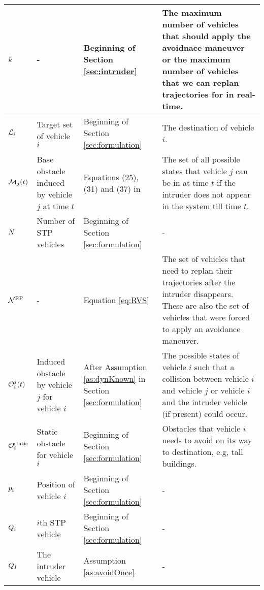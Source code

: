 \begin{table*}
{\begin{tabular}{ |>{\centering\arraybackslash}m{1.2cm}| m{5.2cm} | m{2.8cm} | m{0.3cm + \columnwidth} |}
    $\bar{k}$ & - & Beginning of Section \ref{sec:intruder} & The maximum number of vehicles that should apply the avoidnace maneuver or the maximum number of vehicles that we can replan trajectories for in real-time.    \\ \hline    
    
    $\mathcal{L}_i$ & Target set of vehicle $i$ & Beginning of Section \ref{sec:formulation} & The destination of vehicle $i$.    \\ \hline
    
    $\mathcal{M}_j(t)$ & Base obstacle induced by vehicle $j$ at time $t$ & Equations (25), (31) and (37) in \cite{chen2016robust} & The set of all possible states that vehicle $j$ can be in at time $t$ if the intruder does not appear in the system till time $t$. \\ \hline    
    
    $N$ & Number of STP vehicles & Beginning of Section \ref{sec:formulation} & -    \\ \hline
    $\mathcal{N}^\text{RP}$ & - & Equation \eqref{eq:RVS} & The set of vehicles that need to replan their trajectories after the intruder disappears. These are also the set of vehicles that were forced to apply an avoidance maneuver. \\ \hline
    
    
	$\mathcal{O}_i^j(t)$ & Induced obstacle by vehicle $j$ for vehicle $i$ & After Assumption \ref{as:dynKnown} in Section \ref{sec:formulation} & The possible states of vehicle $i$ such that a collision between vehicle $i$ and vehicle $j$ or vehicle $i$ and the intruder vehicle (if present) could occur.    \\ \hline 
    $\mathcal{O}^\text{static}_i$ & Static obstacle for vehicle $i$ & Beginning of Section \ref{sec:formulation} & Obstacles that vehicle $i$ needs to avoid on its way to destination, e.g, tall buildings. \\ \hline    
    
    $p_i$ & Position of vehicle $i$ & Beginning of Section \ref{sec:formulation} & -    \\ \hline
     
    $Q_{i}$ & $i$th STP vehicle & Beginning of Section \ref{sec:formulation} & -  \\ \hline
    $Q_{I}$ & The intruder vehicle & Assumption \ref{as:avoidOnce} & -  \\ \hline
    

\end{tabular}}
\end{table*}
